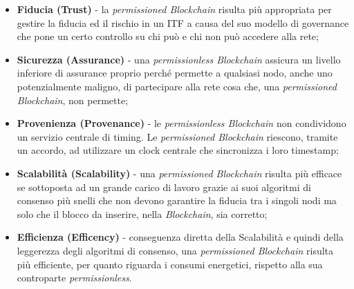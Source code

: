 \begin{itemize}
	\item \textbf{Fiducia (Trust)} - la \textit{permissioned Blockchain} risulta più appropriata per gestire la fiducia ed il rischio in un \gls{ITF} a causa del suo modello di governance che pone un certo controllo su chi può e chi non può accedere alla rete; 
	\item \textbf{Sicurezza (Assurance)} - una \textit{permissionless Blockchain} assicura un livello inferiore di assurance proprio perché permette a qualsiasi nodo, anche uno potenzialmente maligno, di partecipare alla rete cosa che, una \textit{permissioned Blockchain}, non permette;
	\item \textbf{Provenienza (Provenance)} - le \textit{permissionless Blockchain} non condividono un servizio centrale di timing. Le \textit{permissioned Blockchain} riescono, tramite un accordo, ad utilizzare un clock centrale che sincronizza i loro timestamp;
	\item \textbf{Scalabilità (Scalability)} - una \textit{permissioned Blockchain} risulta più efficace se sottoposta ad un grande carico di lavoro grazie ai suoi algoritmi di consenso più snelli che non devono garantire la fiducia tra i singoli nodi ma solo che il blocco da inserire, nella \textit{Blockchain}, sia corretto;
	\item \textbf{Efficienza (Efficency)} - conseguenza diretta della Scalabilità e quindi della leggerezza degli algoritmi di consenso, una \textit{permissioned Blockchain} risulta più efficiente, per quanto riguarda i consumi energetici, rispetto alla sua controparte \textit{permissionless}.
\end{itemize}
